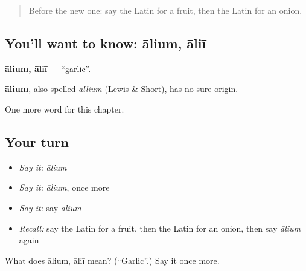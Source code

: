 \label{lesson:LA-C126-alium}



\begin{quote}
Before the new one: say the Latin for a fruit, then the Latin for an onion.
\end{quote}

\subsection*{You'll want to know: ālium, āliī}
\textbf{ālium, āliī} — \textquotedblleft{}garlic\textquotedblright{}.

\begin{cousinweb}
\textbf{ālium}, also spelled \emph{allium} (Lewis \& Short), has no sure origin.
\end{cousinweb}

\begin{grammarlens}[title={What you've built}]
One more word for this chapter.
\end{grammarlens}

\subsection*{Your turn}
\begin{itemize}
\raggedright
  \item \emph{Say it:} \emph{ālium}
  \item \emph{Say it:} \emph{ālium}, once more
  \item \emph{Say it:} say \emph{ālium}
  \item \emph{Recall:} say the Latin for a fruit, then the Latin for an onion, then say \emph{ālium} again
\end{itemize}

\begin{tcolorbox}[breakable,colback=teal!4,colframe=teal!35!black,title={Before you move on}]
What does ālium, āliī mean? (\textquotedblleft{}Garlic\textquotedblright{}.) Say it once more.
\end{tcolorbox}
